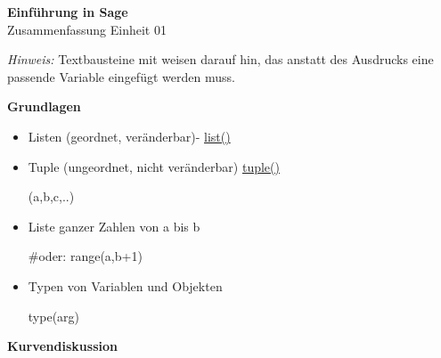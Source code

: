 \documentclass[a4paper,9pt,DIV15,twocolumn]{scrartcl}
\begin{document}
\begin{center}
    \textbf{\LARGE Einf\"uhrung in Sage}\\
    {\large Zusammenfassung Einheit 01}
\end{center}
\textsl{Hinweis:} Textbausteine mit  weisen darauf hin, das anstatt des Ausdrucks eine passende Variable eingefügt werden muss.

\medskip
\textbf{Grundlagen}
\begin{itemize}
    \item Listen (geordnet, veränderbar)- \href{http://docs.python.org/library/functions.html#list}{list()}
        \begin{sagein}
[a,b,c,..]
        \end{sagein}
    \item Tuple (ungeordnet, nicht ver\"anderbar) \href{http://docs.python.org/library/functions.html#tuple}{tuple()}
        \begin{sagein}
(a,b,c,..)
        \end{sagein}
	\item Liste ganzer Zahlen von a bis b
		\begin{sagein}
[a..b] #oder: range(a,b+1)
		\end{sagein}
	\item Typen von Variablen und Objekten
		\begin{sagein}
type(arg)
		\end{sagein}
\end{itemize}  
\textbf{Kurvendiskussion}
\end{document}

